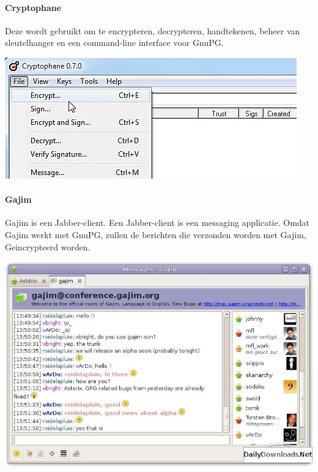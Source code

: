 \documentclass[12pt]{article}
\begin{document}
\paragraph{Cryptophane}
Deze wordt gebruikt om te encrypteren, decrypteren, handtekenen, beheer van sleutelhanger en een command-line interface voor GnuPG.\\
\begin{center}
\includegraphics[scale=0.6]{Pictures/cryptophane}
\end{center}

\paragraph{Gajim}
Gajim is een Jabber-client. Een Jabber-client is een messaging applicatie.
Omdat Gajim werkt met GnuPG, zullen de berichten die verzonden worden met Gajim, Geincrypteerd worden.
\begin{center}
\includegraphics[scale=0.4]{Pictures/gajim}
\end{center}
\end{document}
